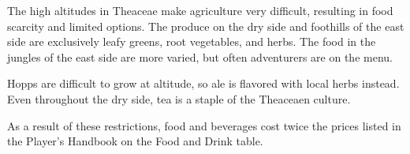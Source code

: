 The high altitudes in Theaceae make agriculture very difficult, resulting in food scarcity and limited options.
The produce on the dry side and foothills of the east side are exclusively leafy greens, root vegetables, and herbs.
The food in the jungles of the east side are more varied, but often adventurers are on the menu.

Hopps are difficult to grow at altitude, so ale is flavored with local herbs instead.
Even throughout the dry side, tea is a staple of the Theaceaen culture.

As a result of these restrictions, food and beverages cost twice the prices listed in the Player's Handbook on the Food and Drink table.
